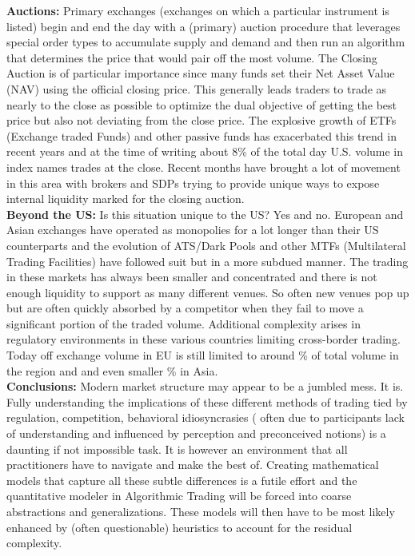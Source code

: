 \noindent\textbf{Auctions:} Primary exchanges (exchanges on which a particular instrument is listed) begin and end the day with a (primary) auction procedure that leverages special order types to accumulate supply and demand and then run an algorithm that determines the price that would pair off the most volume. The Closing Auction is of particular importance since many funds set their Net Asset Value (NAV) using the official closing price. This generally leads traders to trade as nearly to the close as possible to optimize the dual objective of getting the best price but also not deviating from the close price. The explosive growth of ETFs (Exchange traded Funds) and other passive funds has exacerbated this trend in recent years and at the time of writing about 8\% of the total day U.S. volume in index names trades at the close. Recent months have brought a lot of movement in this area with brokers and SDPs trying to provide unique ways to expose internal liquidity marked for the closing auction. \\
 
 
\noindent\textbf{Beyond the US:} Is this situation unique to the US? Yes and no. European and Asian exchanges have operated as monopolies for a lot longer than their US counterparts and the evolution of ATS/Dark Pools and other MTFs (Multilateral Trading Facilities) have followed suit but in a more subdued manner. The trading in these markets has always been smaller and concentrated and there is not enough liquidity to support as many different venues. So often new venues pop up but are often quickly absorbed by a competitor when they fail to move a significant portion of the traded volume. Additional complexity arises in regulatory environments in these various countries limiting cross-border trading. Today off exchange volume in EU is still limited to around  \%  of total volume in the region and  and even smaller \% in Asia. \\


\noindent\textbf{Conclusions:} Modern market structure may appear to be a jumbled mess. It is. Fully understanding the implications of these different methods of trading tied by regulation, competition, behavioral idiosyncrasies ( often due to participants lack of understanding and influenced by perception and preconceived notions)  is a daunting if not impossible task. It is however an environment that all practitioners have to navigate and make the best of. Creating mathematical models that capture all these subtle differences is a futile effort and the quantitative modeler in Algorithmic Trading will be forced into coarse abstractions and generalizations. These models will then have to be most likely enhanced by (often questionable) heuristics to account for the residual complexity. 


